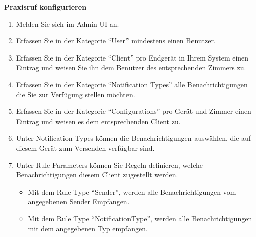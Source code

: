 \textbf{Praxisruf konfigurieren}
\begin{enumerate}
    \item Melden Sie sich im Admin UI an.
    \item Erfassen Sie in der Kategorie ``User'' mindestens einen Benutzer.
    \item Erfassen Sie in der Kategorie ``Client'' pro Endgerät in Ihrem System einen Eintrag und weisen Sie ihn dem Benutzer des entsprechenden Zimmers zu.
    \item Erfassen Sie in der Kategorie ``Notification Types'' alle Benachrichtigungen die Sie zur Verfügung stellen möchten.
    \item Erfassen Sie in der Kategorie ``Configurations'' pro Gerät und Zimmer einen Eintrag und weisen es dem entsprechenden Client zu.
    \item Unter Notification Types können die Benachrichtigungen auswählen, die auf diesem Gerät zum Versenden verfügbar sind.
    \item Unter Rule Parameters können Sie Regeln definieren, welche Benachrichtigungen diesem Client zugestellt werden.
    \begin{itemize}
        \item Mit dem Rule Type ``Sender'', werden alle Benachrichtigungen vom angegebenen Sender Empfangen.
        \item Mit dem Rule Type ``NotificationType'', werden alle Benachrichtigungen mit dem angegebenen Typ empfangen.
    \end{itemize}
\end{enumerate}

\clearpage
